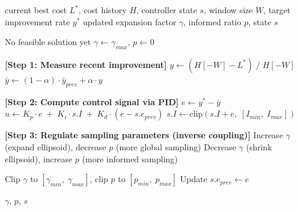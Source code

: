 \documentclass[11pt]{article}
\begin{document}
\begin{algorithm}
\caption{SSFOR: Search-State Feedback Online Regulation}
\begin{algorithmic}[1]
\Require current best cost $L^*$, cost history $H$, controller state $s$,
         window size $W$, target improvement rate $y^*$
\Ensure  updated expansion factor $\gamma$, informed ratio $p$, state $s$

  \State No feasible solution yet
  \Return $\gamma \leftarrow \gamma_{max}$, $p \leftarrow 0$
\EndIf

\State \textbf{[Step 1: Measure recent improvement]}
\State $y \leftarrow (H[-W] - L^*) \;/\; H[-W]$
\State $\bar{y} \leftarrow (1 - \alpha) \cdot \bar{y}_{prev} + \alpha \cdot y$

\State \textbf{[Step 2: Compute control signal via PID]}
\State $e \leftarrow y^* - \bar{y}$
\State $u \leftarrow K_p \cdot e \;+\; K_i \cdot s.I \;+\; K_d \cdot (e - s.e_{prev})$
\State $s.I \leftarrow \text{clip}(s.I + e,\; [I_{min},\; I_{max}])$

\State \textbf{[Step 3: Regulate sampling parameters (inverse coupling)]}
  \State Increase $\gamma$ (expand ellipsoid), decrease $p$ (more global sampling)
\Else
  \State Decrease $\gamma$ (shrink ellipsoid), increase $p$ (more informed sampling)
\EndIf

\State Clip $\gamma$ to $[\gamma_{min},\; \gamma_{max}]$,\; clip $p$ to $[p_{min},\; p_{max}]$
\State Update $s.e_{prev} \leftarrow e$

\Return $\gamma$, $p$, $s$
\end{algorithmic}
\end{algorithm}
\end{document}
